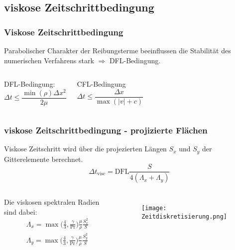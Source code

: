 \documentclass[
	11pt, %
	aspectratio=169, %
]{beamer}
\begin{document}
\subsection{viskose Zeitschrittbedingung}
\begin{frame}
	\frametitle{Viskose Zeitschrittbedingung}
	Parabolischer Charakter der Reibungsterme beeinflussen die Stabilität des numerischen Verfahrens stark
	$\Rightarrow$ DFL-Bedingung.
	\vspace*{1cm}


	\begin{columns}
		DFL-Bedingung:
		\begin{equation}
			\Delta t \leq \frac{\min(\rho)\Delta x^2}{2\mu}
		\end{equation} 

		CFL-Bedingung
		\begin{equation}
			\Delta t \leq \frac{\Delta x}{\max (|v|+c)}
		\end{equation}
			
		
	\end{columns}



\end{frame}


\begin{frame}
	\frametitle{viskose Zeitschrittbedingung - projizierte Flächen}

	Viskose Zeitschritt wird über die projezierten Längen $S_x$ und $S_y$ der Gitterelemente berechnet.
	\begin{equation}
		\Delta t_{\mathrm{visc}} = \mathrm{DFL}\frac{S}{4(\Lambda_x+\Lambda_y)}
	\end{equation}

	\begin{columns}
		\column{0.6 \textwidth}
			Die viskosen spektralen Radien sind dabei:
			\begin{align}
				\Lambda_x = \max\biggl(\frac{4}{3}, \frac{\gamma}{\mathrm{Pr}} \biggr) \frac{\mu}{\rho} \frac{S_x^2}{S} \\
				\Lambda_y = \max\biggl(\frac{4}{3}, \frac{\gamma}{\mathrm{Pr}} \biggr) \frac{\mu}{\rho} \frac{S_y^2}{S}
			\end{align}
		\column{0.4 \textwidth}

		\begin{figure}
			\texttt{[image: Zeitdiskretisierung.png]}
		\end{figure}
	\end{columns}

\end{frame}
\end{document}
